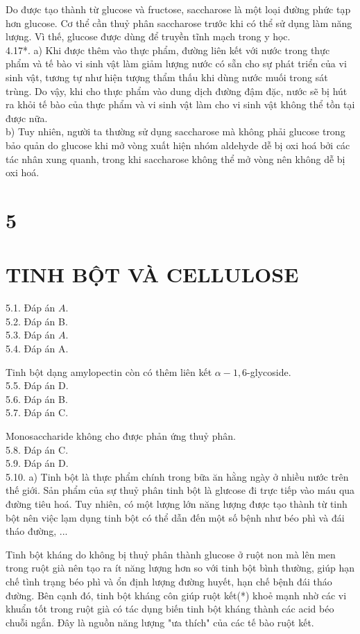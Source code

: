 \documentclass[10pt]{article}
\begin{document}
Do được tạo thành từ glucose và fructose, saccharose là một loại đường phức tạp hơn glucose. Cơ thể cần thuỷ phân saccharose trước khi có thể sử dụng làm năng lượng. Vì thế, glucose được dùng để truyền tĩnh mạch trong y học.\\
4.17*. a) Khi được thêm vào thực phẩm, đường liên kết với nước trong thực phẩm và tế bào vi sinh vật làm giảm lượng nước có sẵn cho sự phát triển của vi sinh vật, tương tự như hiện tượng thẩm thấu khi dùng nước muối trong sát trùng. Do vậy, khi cho thực phẩm vào dung dịch đường đậm đặc, nước sẽ bị hút ra khỏi tế bào của thực phẩm và vi sinh vật làm cho vi sinh vật không thể tồn tại được nữa.\\
b) Tuy nhiên, người ta thường sử dụng saccharose mà không phải glucose trong bảo quản do glucose khi mở vòng xuất hiện nhóm aldehyde dễ bị oxi hoá bởi các tác nhân xung quanh, trong khi saccharose không thể mở vòng nên không dễ bị oxi hoá.

\section*{5}
\section*{TINH BỘT VÀ CELLULOSE}
5.1. Đáp án $A$.\\
5.2. Đáp án B.\\
5.3. Đáp án $A$.\\
5.4. Đáp án A.

Tinh bột dạng amylopectin còn có thêm liên kết $\alpha-1,6$-glycoside.\\
5.5. Đáp án D.\\
5.6. Đáp án B.\\
5.7. Đáp án C.

Monosaccharide không cho được phản ứng thuỷ phân.\\
5.8. Đáp án C.\\
5.9. Đáp án D.\\
5.10. a) Tinh bột là thực phẩm chính trong bữa ăn hằng ngày ở nhiều nước trên thế giới. Sản phẩm của sự thuỷ phân tinh bột là glưcose đi trực tiếp vào máu qua đường tiêu hoá. Tuy nhiên, có một lượng lớn năng lượng được tạo thành từ tinh bột nên việc lạm dụng tinh bột có thể dẫn đến một số bệnh như béo phì và đái tháo đường, ...

Tinh bột kháng do không bị thuỷ phân thành glucose ở ruột non mà lên men trong ruột già nên tạo ra ít năng lượng hơn so với tinh bột bình thường, giúp hạn chế tình trạng béo phì và ổn định lượng đường huyết, hạn chế bệnh đái tháo đường. Bên cạnh đó, tinh bột kháng côn giúp ruột kết(*) khoẻ mạnh nhờ các vi khuẩn tốt trong ruột già có tác dụng biến tinh bột kháng thành các acid béo chuỗi ngắn. Đây là nguồn năng lượng "ưa thích" của các tế bào ruột kết.
\end{document}
